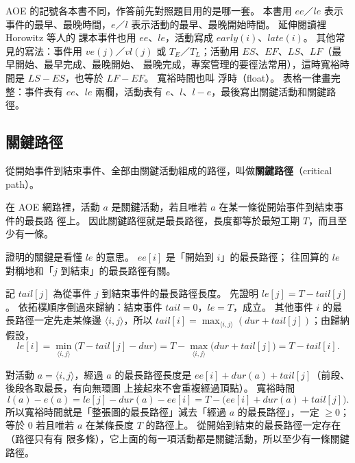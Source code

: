 \begin{examnote}
AOE 的記號各本書不同，作答前先對照題目用的是哪一套。 本書用 $\mathit{ee}$／$\mathit{le}$
表示事件的最早、最晚時間，$e$／$l$ 表示活動的最早、最晚開始時間。 延伸閱讀裡 Horowitz 等人的
課本事件也用 $\mathit{ee}$、$\mathit{le}$，活動寫成 $\mathit{early}(i)$、$\mathit{late}(i)$。
其他常見的寫法：事件用 $\mathit{ve}(j)$／$\mathit{vl}(j)$ 或 $T_E$／$T_L$；活動用
$\mathit{ES}$、$\mathit{EF}$、$\mathit{LS}$、$\mathit{LF}$（最早開始、最早完成、最晚開始、
最晚完成，專案管理的要徑法常用），這時寬裕時間是 $\mathit{LS} - \mathit{ES}$，也等於
$\mathit{LF} - \mathit{EF}$。 寬裕時間也叫
浮時（float）。 表格一律畫完整：事件表有 $\mathit{ee}$、$\mathit{le}$ 兩欄，活動表有
$e$、$l$、$l - e$，最後寫出關鍵活動和關鍵路徑。
\end{examnote}

\subsection{關鍵路徑}

\begin{definition}[關鍵路徑]
從開始事件到結束事件、全部由關鍵活動組成的路徑，叫做\textbf{關鍵路徑}（critical path）。
\end{definition}

\begin{theorem}
\label{thm:tps-critical}
在 AOE 網路裡，活動 $a$ 是關鍵活動，若且唯若 $a$ 在某一條從開始事件到結束事件的最長路
徑上。 因此關鍵路徑就是最長路徑，長度都等於最短工期 $T$，而且至少有一條。
\end{theorem}

證明的關鍵是看懂 $\mathit{le}$ 的意思。 $\mathit{ee}[i]$ 是「開始到 $i$」的最長路徑；
往回算的 $\mathit{le}$ 對稱地和「$j$ 到結束」的最長路徑有關。

\begin{whybox}
記 $\mathit{tail}[j]$ 為從事件 $j$ 到結束事件的最長路徑長度。 先證明
$\mathit{le}[j] = T - \mathit{tail}[j]$。 依拓樸順序倒過來歸納：結束事件
$\mathit{tail} = 0$，$\mathit{le} = T$，成立。 其他事件 $i$ 的最長路徑一定先走某條邊
$\langle i, j \rangle$，所以 $\mathit{tail}[i] = \max_{\langle i, j \rangle}
(\mathit{dur} + \mathit{tail}[j])$；由歸納假設，
\[
\mathit{le}[i] = \min_{\langle i, j \rangle} \bigl( T - \mathit{tail}[j] - \mathit{dur} \bigr)
= T - \max_{\langle i, j \rangle} \bigl( \mathit{dur} + \mathit{tail}[j] \bigr) = T - \mathit{tail}[i].
\]

對活動 $a = \langle i, j \rangle$，經過 $a$ 的最長路徑長度是
$\mathit{ee}[i] + \mathit{dur}(a) + \mathit{tail}[j]$（前段、後段各取最長，有向無環圖
上接起來不會重複經過頂點）。 寬裕時間
\[
l(a) - e(a) = \mathit{le}[j] - \mathit{dur}(a) - \mathit{ee}[i]
= T - \bigl( \mathit{ee}[i] + \mathit{dur}(a) + \mathit{tail}[j] \bigr).
\]
所以寬裕時間就是「整張圖的最長路徑」減去「經過 $a$ 的最長路徑」，一定 $\ge 0$；等於
$0$ 若且唯若 $a$ 在某條長度 $T$ 的路徑上。 從開始到結束的最長路徑一定存在（路徑只有有
限多條），它上面的每一項活動都是關鍵活動，所以至少有一條關鍵路徑。
\end{whybox}

